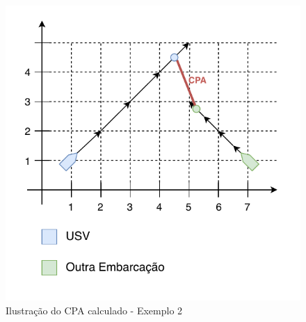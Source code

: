         \begin{figure}
            \centering
            \includegraphics{fig/chap2/cpa_explanation_almost_collision.pdf}
            \caption{Ilustração do CPA calculado - Exemplo 2}
            \label{fig:chap2_almost_collision}
        \end{figure} 